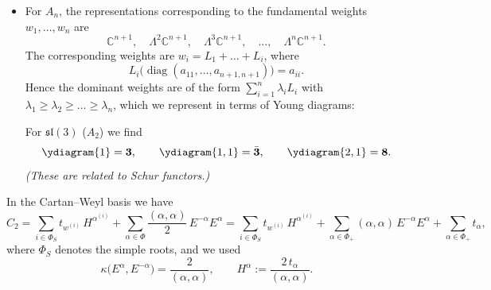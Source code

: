 {\begin{itemize}
        \item For $A_n$, the representations corresponding to the fundamental weights
        $w_1, \dots, w_n$ are
        \[
            \mathbb{C}^{n+1},\quad \Lambda^2 \mathbb{C}^{n+1},\quad \Lambda^3 \mathbb{C}^{n+1},\quad
            \dots,\quad \Lambda^n \mathbb{C}^{n+1}.
        \]
        The corresponding weights are $w_i = L_1 + \dots + L_i$, where
        \[
            L_i\big(\operatorname{diag}(a_{11}, \dots, a_{n+1,n+1})\big) = a_{ii}.
        \]
        Hence the dominant weights are of the form $\sum_{i=1}^n \lambda_i L_i$ with
        $\lambda_1 \geq \lambda_2 \geq \dots \geq \lambda_n$, which we represent in terms of Young
        diagrams:
        \begin{center}
        \end{center}
        For $\mathfrak{sl}(3)$ ($A_2$) we find
        \[
            \ydiagram{1} = \mathbf{3},
            \qquad
            \ydiagram{1,1} = \bar{\mathbf{3}},
            \qquad
            \ydiagram{2,1} = \mathbf{8}.
        \]
        \emph{(These are related to Schur functors.)}
    \end{itemize}
}


In the Cartan--Weyl basis we have
\[
    C_2 = \sum_{i \in \Phi_S} t_{w^{(i)}}\, H^{\alpha^{(i)}}
        + \sum_{\alpha \in \Phi} \frac{(\alpha, \alpha)}{2}\, E^{-\alpha} E^{\alpha}
        = \sum_{i \in \Phi_S} t_{w^{(i)}}\, H^{\alpha^{(i)}}
        + \sum_{\alpha \in \Phi_+} (\alpha, \alpha)\, E^{-\alpha} E^{\alpha}
        + \sum_{\alpha \in \Phi_+} t_\alpha,
\]
where $\Phi_S$ denotes the simple roots, and we used
\[
    \kappa\big(E^{\alpha}, E^{-\alpha}\big) = \frac{2}{(\alpha, \alpha)},
    \qquad
    H^{\alpha} := \frac{2\, t_\alpha}{(\alpha, \alpha)}.
\]

